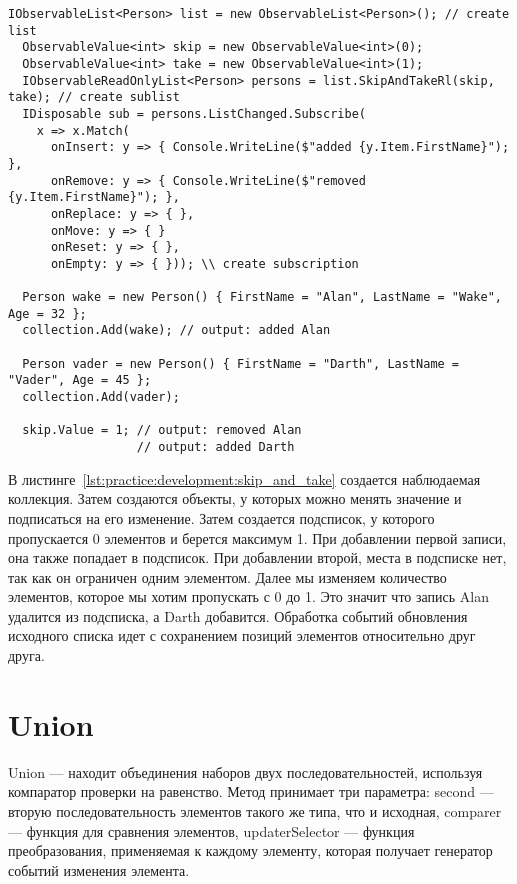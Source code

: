 \begin{lstlisting}[style=csharpinlinestyle, caption={Пример использования SkipAndTake}, label=lst:practice:development:skip_and_take]
  IObservableList<Person> list = new ObservableList<Person>(); // create list
  ObservableValue<int> skip = new ObservableValue<int>(0);
  ObservableValue<int> take = new ObservableValue<int>(1);
  IObservableReadOnlyList<Person> persons = list.SkipAndTakeRl(skip, take); // create sublist
  IDisposable sub = persons.ListChanged.Subscribe(
    x => x.Match(
      onInsert: y => { Console.WriteLine($"added {y.Item.FirstName}"); },
      onRemove: y => { Console.WriteLine($"removed {y.Item.FirstName}"); },
      onReplace: y => { },
      onMove: y => { }
      onReset: y => { },
      onEmpty: y => { })); \\ create subscription

  Person wake = new Person() { FirstName = "Alan", LastName = "Wake", Age = 32 };
  collection.Add(wake); // output: added Alan

  Person vader = new Person() { FirstName = "Darth", LastName = "Vader", Age = 45 };
  collection.Add(vader);

  skip.Value = 1; // output: removed Alan
                  // output: added Darth
\end{lstlisting}

В листинге~\ref{lst:practice:development:skip_and_take} создается наблюдаемая коллекция. Затем создаются объекты, у которых можно менять значение и подписаться на его изменение.
Затем создается подсписок, у которого пропускается 0 элементов и берется максимум 1. При добавлении первой записи, она также попадает в подсписок.
При добавлении второй, места в подсписке нет, так как он ограничен одним элементом. Далее мы изменяем количество элементов, которое мы хотим пропускать с 0 до 1. Это значит что запись Alan удалится
из подсписка, а Darth добавится. Обработка событий обновления исходного списка идет с сохранением позиций элементов относительно друг друга.

\section{Union}
\label{sub:development:union}

Union --- находит объединения наборов двух последовательностей, используя компаратор проверки на равенство.
Метод принимает три параметра: second --- вторую последовательность элементов такого же типа, что и исходная,
comparer --- функция для сравнения элементов, updaterSelector --- функция преобразования, применяемая к каждому элементу, которая получает генератор событий изменения элемента.

